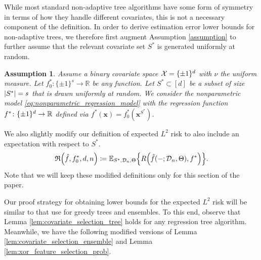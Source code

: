 \documentclass[11pt]{article}
\newtheorem{assumption}[theorem]{Assumption}
\newcommand{\bx}{\mathbf{x}}
\DeclarePairedDelimiter{\braces}{\lbrace}{\rbrace}
\DeclarePairedDelimiter{\paren}{(}{)}
\DeclarePairedDelimiter{\abs}{|}{|}
\newcommand{\R}{\mathbb{R}}
\newcommand{\E}{\mathbb{E}}
\renewcommand{\xspace}{\mathcal{X}}
\newcommand{\binspace}{\braces{\pm 1}^\nfeats}
\newcommand{\xmeasure}{\nu}
\newcommand{\sparsity}{s}
\newcommand{\nfeats}{d}
\newcommand{\nsamples}{n}
\newcommand{\coordindices}{[\nfeats]}
\newcommand{\data}[1][n]{\mathcal{D}_{#1}}
\newcommand{\funcclass}{\mathfrak{F}}
\newcommand{\suppset}{S^*}
\newcommand{\objective}{\mathfrak{R}}
\newcommand{\sparsefuncs}{\funcclass_\sparsity}
\begin{document}
While most standard non-adaptive tree algorithms have some form of symmetry in terms of how they handle different covariates, this is not a necessary component of the definition.
In order to derive estimation error lower bounds for non-adaptive trees, we therefore first augment Assumption \ref{assumption} to further assume that the relevant covariate set $\suppset$ is generated uniformly at random.

\begin{assumption}
    \label{assumption_nonadaptive}
    Assume a binary covariate space $\xspace = \binspace$ with $\xmeasure$ the uniform measure.
    Let $f^*_0\colon \lbrace\pm 1\rbrace^\sparsity \to \R$ be any function.
    Let $\suppset \subset \coordindices$ be a subset of size $\abs*{\suppset} = \sparsity$ that is drawn uniformly at random.
    We consider the nonparametric model \eqref{eq:nonparametric_regression_model} with the regression function $f^*\colon \binspace \to \R$ defined via $f^*(\bx) = f^*_0(\bx^{\suppset})$.
\end{assumption}

We also slightly modify our definition of expected $L^2$ risk to also include an expectation with respect to $\suppset$.
\begin{equation}
    \objective\paren*{\hat f, f^*_0,\nfeats,\nsamples} \coloneqq \E_{\suppset,\data,\Theta}\braces*{R\paren*{\hat f(-;\data,\Theta),f^*}}.
\end{equation}
Note that we will keep these modified definitions only for this section of the paper.

Our proof strategy for obtaining lower bounds for the expected $L^2$ risk will be similar to that use for greedy trees and ensembles.
To this end, observe that Lemma \ref{lem:covariate_selection_tree} holds for any regression tree algorithm.
Meanwhile, we have the following modified versions of Lemma \ref{lem:covariate_selection_ensemble} and Lemma \ref{lem:xor_feature_selection_prob}.
\end{document}
